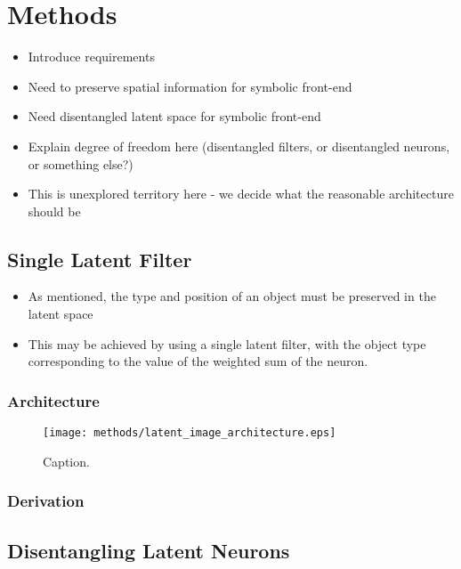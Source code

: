 \chapter{Methods}
\begin{itemize}
\item Introduce requirements
\item Need to preserve spatial information for symbolic front-end
\item Need disentangled latent space for symbolic front-end
\item Explain degree of freedom here (disentangled filters, or disentangled neurons, or something else?)
\item This is unexplored territory here - we decide what the reasonable architecture should be
\end{itemize}

\label{ch:methods}


%
%
%
%
%
\section{Single Latent Filter}

\begin{itemize}
\item As mentioned, the type and position of an object must be preserved in the latent space
\item This may be achieved by using a single latent filter, with the object type corresponding to the value of the weighted sum of the neuron.
\end{itemize}

\subsection{Architecture}
\begin{figure}[H]
\centering
\captionsetup{justification=centering}
\texttt{[image: methods/latent\_image\_architecture.eps]}
\caption{Caption.}
\label{fig:latent_image_architecture}
\end{figure}

\subsection{Derivation}

%
%
%
%
%
\section{Disentangling Latent Neurons}
\lipsum[2]
